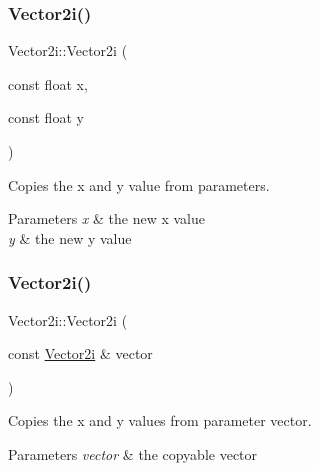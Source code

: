 \subsubsection{\texorpdfstring{Vector2i()}{Vector2i()}\hspace{0.1cm}{\footnotesize\ttfamily [2/4]}}
{\footnotesize\ttfamily Vector2i\+::\+Vector2i (\begin{DoxyParamCaption}\item[{const float}]{x,  }\item[{const float}]{y }\end{DoxyParamCaption})\hspace{0.3cm}{\ttfamily [inline]}}



Copies the x and y value from parameters. 


\begin{DoxyParams}{Parameters}
{\em x} & the new x value \\
\hline
{\em y} & the new y value \\
\hline
\end{DoxyParams}
\mbox{\label{class_vector2i_adbf2fd9e34af2e90dc22339eab2c4524}} 
\subsubsection{\texorpdfstring{Vector2i()}{Vector2i()}\hspace{0.1cm}{\footnotesize\ttfamily [3/4]}}
{\footnotesize\ttfamily Vector2i\+::\+Vector2i (\begin{DoxyParamCaption}\item[{const \mbox{\hyperlink{class_vector2i}{Vector2i}} \&}]{vector }\end{DoxyParamCaption})\hspace{0.3cm}{\ttfamily [inline]}}



Copies the x and y values from parameter vector. 


\begin{DoxyParams}{Parameters}
{\em vector} & the copyable vector \\
\hline
\end{DoxyParams}
\mbox{\label{class_vector2i_ab715344e281f1ea627ed55fe576eda47}} 

